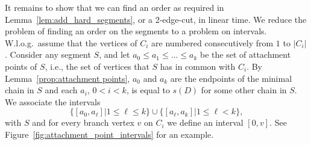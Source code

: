 \documentclass[paper=a4]{scrartcl}
\begin{document}
It remains to show that we can find an order as required in Lemma~\ref{lem:add_hard_segments}, or a 2-edge-cut, in linear time. We reduce the problem of finding an order on the segments to a problem on intervals. W.l.o.g.\ assume that the vertices of $C_i$ are numbered consecutively from $1$ to $|C_i|$. Consider any segment $S$, and let $a_0\leq a_1\leq \ldots \leq a_k$ be the set of attachment points of $S$, i.e., the set of vertices that $S$ has in common with $C_i$. By Lemma~\ref{prop:attachment points}, $a_0$ and $a_k$ are the endpoints of the minimal chain in $S$ and each $a_i$, $0 < i < k$, is equal to $s(D)$ for some other chain in $S$. We associate the intervals\[
  \{[a_0,a_\ell] | 1\leq \ell \leq k\} \cup \{[a_\ell,a_k] | 1\leq \ell< k\},
\]
with $S$ and for every branch vertex $v$ on $C_i$ we define an interval $[0,v]$. See Figure~\ref{fig:attachment_point_intervals} for an example.
\end{document}
